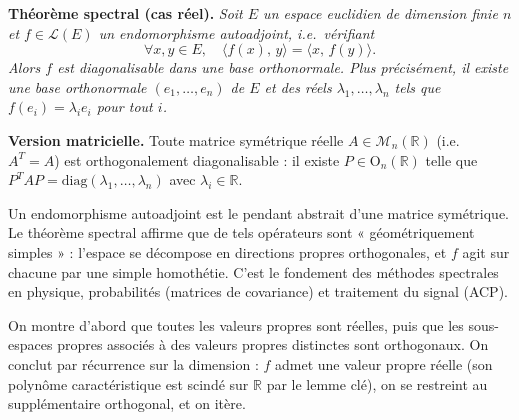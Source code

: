 ﻿%



\begin{tcolorbox}[thmbox]
  \textbf{Théorème spectral (cas réel).}\enspace%
  \textit{Soit $E$ un espace euclidien de dimension finie $n$ et
  $f \in \mathcal{L}(E)$ un endomorphisme autoadjoint, i.e.\ vérifiant
  \[
    \forall x,y \in E,\quad \langle f(x),\,y\rangle = \langle x,\,f(y)\rangle.
  \]
  Alors $f$ est diagonalisable dans une base orthonormale. Plus précisément,
  il existe une base orthonormale $(e_1,\ldots,e_n)$ de $E$ et des réels
  $\lambda_1,\ldots,\lambda_n$ tels que $f(e_i) = \lambda_i e_i$ pour tout $i$.}

  \medskip
  \textbf{Version matricielle.}
  Toute matrice symétrique réelle $A \in \mathcal{M}_n(\mathbb{R})$
  (i.e.\ $A^T = A$) est orthogonalement diagonalisable : il existe
  $P \in \mathrm{O}_n(\mathbb{R})$ telle que $P^T A P = \mathrm{diag}(\lambda_1,\ldots,\lambda_n)$
  avec $\lambda_i \in \mathbb{R}$.
\end{tcolorbox}

\begin{significationintuitive}
Un endomorphisme autoadjoint est le pendant abstrait d'une matrice symétrique.
Le théorème spectral affirme que de tels opérateurs sont « géométriquement
simples » : l'espace se décompose en directions propres orthogonales, et
$f$ agit sur chacune par une simple homothétie. C'est le fondement des
méthodes spectrales en physique, probabilités (matrices de covariance)
et traitement du signal (ACP).
\end{significationintuitive}

\decsep{}


\begin{ideepreuve}
On montre d'abord que toutes les valeurs propres sont réelles, puis que
les sous-espaces propres associés à des valeurs propres distinctes sont
orthogonaux. On conclut par récurrence sur la dimension : $f$ admet une
valeur propre réelle (son polynôme caractéristique est scindé sur $\mathbb{R}$
par le lemme clé), on se restreint au supplémentaire orthogonal, et on itère.
\end{ideepreuve}

